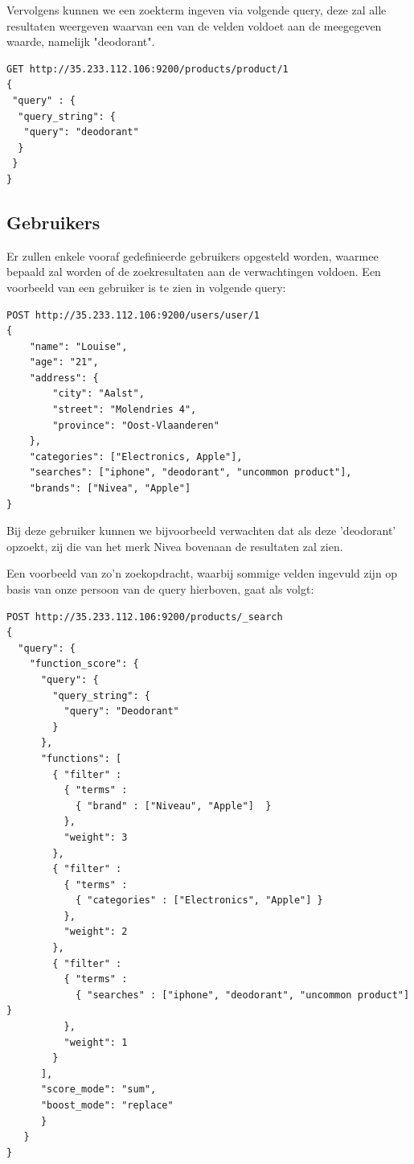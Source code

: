 Vervolgens kunnen we een zoekterm ingeven via volgende query, deze zal alle resultaten weergeven waarvan een van de velden voldoet aan de meegegeven waarde, namelijk "deodorant". 

\begin{lstlisting}[caption={Query om één enkel product op te halen},captionpos=b]
GET http://35.233.112.106:9200/products/product/1 
{
 "query" : {
  "query_string": {
   "query": "deodorant"
  }
 }
}
\end{lstlisting}

\subsection{Gebruikers}

Er zullen enkele vooraf gedefinieerde gebruikers opgesteld worden, waarmee bepaald zal worden of de zoekresultaten aan de verwachtingen voldoen. Een voorbeeld van een gebruiker is te zien in volgende query:
\begin{lstlisting}[caption={Query om één enkele gebruiker aan te maken}]
POST http://35.233.112.106:9200/users/user/1
{
	"name": "Louise",
	"age": "21",
	"address": {
		"city": "Aalst",
		"street": "Molendries 4",
		"province": "Oost-Vlaanderen"
	},
	"categories": ["Electronics, Apple"],
	"searches": ["iphone", "deodorant", "uncommon product"],
	"brands": ["Nivea", "Apple"]
}
\end{lstlisting}

Bij deze gebruiker kunnen we bijvoorbeeld verwachten dat als deze 'deodorant' opzoekt, zij die van het merk Nivea bovenaan de resultaten zal zien. 

Een voorbeeld van zo'n zoekopdracht, waarbij sommige velden ingevuld zijn op basis van onze persoon van de query hierboven, gaat als volgt:

\begin{lstlisting}[caption={Query om een zoekopdracht met term 'Deodorant' uit te voeren, met filters en een score op basis van informatie van een gebruiker}]
POST http://35.233.112.106:9200/products/_search
{
  "query": {
    "function_score": {
      "query": {
        "query_string": {
          "query": "Deodorant"
        }
      },
      "functions": [
        { "filter" : 
          { "terms" : 
            { "brand" : ["Niveau", "Apple"]  } 
          },
          "weight": 3
        },
        { "filter" : 
          { "terms" : 
            { "categories" : ["Electronics", "Apple"] }
          },
          "weight": 2
        },
        { "filter" : 
          { "terms" : 
            { "searches" : ["iphone", "deodorant", "uncommon product"] } 
          },
          "weight": 1
        }
      ],
      "score_mode": "sum",
      "boost_mode": "replace"
      }
   }
}
\end{lstlisting}

